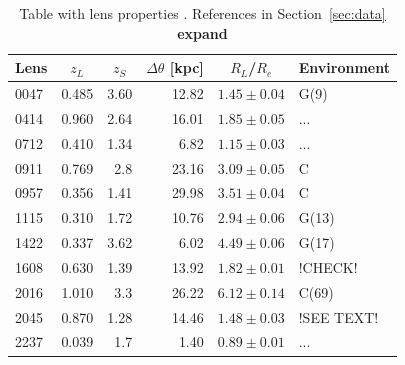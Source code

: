 \documentclass[useAMS,usenatbib]{mn2e}
\begin{document}
\begin{table}
  \begin{center}
    \begin{tabular}{l r r r r l}
      Lens    & \multicolumn{1}{c}{$z_{L}$} & \multicolumn{1}{c}{$z_{S}$} & \multicolumn{1}{c}{$\Delta\theta$ [kpc]} & \multicolumn{1}{c}{$R_{L}$/$R_{e}$} & Environment \\ \hline
      0047 & 0.485 & 3.60 & 12.82 & $1.45\pm0.04$ & G(9) \\
      0414 & 0.960 & 2.64 & 16.01 & $1.85\pm0.05$ & ... \\
      0712 & 0.410 & 1.34 & 6.82  & $1.15\pm0.03$ & ... \\
      0911 & 0.769 & 2.8  & 23.16 & $3.09\pm0.05$ & C \\
      0957 & 0.356 & 1.41 & 29.98 & $3.51\pm0.04$ & C \\
      1115 & 0.310 & 1.72 & 10.76 & $2.94\pm0.06$ & G(13) \\
      1422 & 0.337 & 3.62 & 6.02  & $4.49\pm0.06$ & G(17) \\
      1608 & 0.630 & 1.39 & 13.92 & $1.82\pm0.01$ & !CHECK! \\
      2016 & 1.010 & 3.3  & 26.22 & $6.12\pm0.14$ & C(69) \\
      2045 & 0.870 & 1.28 & 14.46 & $1.48\pm0.03$ & !SEE TEXT! \\
      2237 & 0.039 & 1.7  & 1.40  & $0.89\pm0.01$ & ... \\
    \end{tabular}
    \caption[width=\linewidth]{Table with lens properties \citep[see][]{2011ApJ...740...97L}. References in Section~\ref{sec:data} \textbf{expand}}
    \label{tab:lensproperties}
  \end{center}
\end{table}
\end{document}
